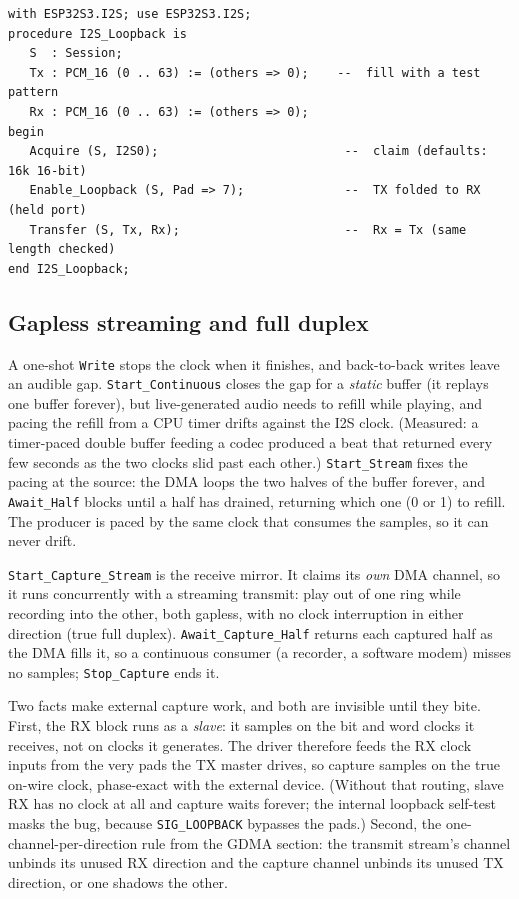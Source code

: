 \begin{lstlisting}
with ESP32S3.I2S; use ESP32S3.I2S;
procedure I2S_Loopback is
   S  : Session;
   Tx : PCM_16 (0 .. 63) := (others => 0);    --  fill with a test pattern
   Rx : PCM_16 (0 .. 63) := (others => 0);
begin
   Acquire (S, I2S0);                          --  claim (defaults: 16k 16-bit)
   Enable_Loopback (S, Pad => 7);              --  TX folded to RX (held port)
   Transfer (S, Tx, Rx);                       --  Rx = Tx (same length checked)
end I2S_Loopback;
\end{lstlisting}

\subsection{Gapless streaming and full duplex}

A one-shot \texttt{Write} stops the clock when it finishes, and back-to-back
writes leave an audible gap. \texttt{Start\_Continuous} closes the gap for a
\emph{static} buffer (it replays one buffer forever), but live-generated audio
needs to refill while playing, and pacing the refill from a CPU timer drifts
against the I2S clock. (Measured: a timer-paced double buffer feeding a codec
produced a beat that returned every few seconds as the two clocks slid past each
other.) \texttt{Start\_Stream} fixes the pacing at the source: the DMA loops
the two halves of the buffer forever, and \texttt{Await\_Half} blocks until a
half has drained, returning which one (0 or 1) to refill. The producer is paced
by the same clock that consumes the samples, so it can never drift.

\texttt{Start\_Capture\_Stream} is the receive mirror. It claims its
\emph{own} DMA channel, so it runs concurrently with a streaming transmit:
play out of one ring while recording into the other, both gapless, with no
clock interruption in either direction (true full duplex).
\texttt{Await\_Capture\_Half} returns each captured half as the DMA fills
it, so a continuous consumer (a recorder, a software modem) misses no samples;
\texttt{Stop\_Capture} ends it.

Two facts make external capture work, and both are invisible until they bite.
First, the RX block runs as a \emph{slave}: it samples on the bit and word
clocks it receives, not on clocks it generates. The driver therefore feeds the
RX clock inputs from the very pads the TX master drives, so capture samples on
the true on-wire clock, phase-exact with the external device. (Without that
routing, slave RX has no clock at all and capture waits forever; the internal
loopback self-test masks the bug, because \texttt{SIG\_LOOPBACK} bypasses the
pads.) Second, the one-channel-per-direction rule from the GDMA section: the
transmit stream's channel unbinds its unused RX direction and the capture
channel unbinds its unused TX direction, or one shadows the other.

